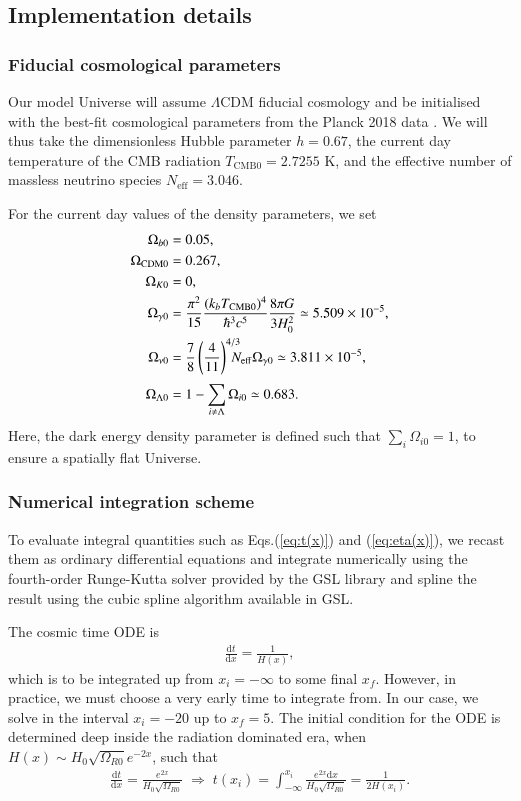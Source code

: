 \documentclass[twocolumn]{aa}
\renewcommand{\d}{\text{d}}
\newcommand{\dd}[2]{\frac{\d #1}{\d #2}}
\begin{document}
\subsection{Implementation details}
\subsubsection{Fiducial cosmological parameters}
Our model Universe will assume $\Lambda$CDM fiducial cosmology and be initialised with the best-fit cosmological parameters from the Planck 2018 data \citep{planck2020}. We will thus take the dimensionless Hubble parameter $h=0.67$, the current day temperature of the CMB radiation $T_\text{CMB0} = 2.7255\text{ K}$, and the effective number of massless neutrino species $N_\text{eff}=3.046$.

For the current day values of the density parameters, we set 
\begin{align*}
      \Omega_{b0} &= 0.05,\\
      \Omega_\text{CDM0} &= 0.267,\\
      \Omega_{K0} &= 0,\\
      \Omega_{\gamma0} &=  \frac{\pi^2}{15} \frac{(k_bT_{\rm CMB 0})^4}{\hbar^3 c^5} \frac{8\pi G} {3H_0^2} \simeq 5.509\times 10^{-5},\\
      \Omega_{\nu 0} &= \frac{7}{8}\left(\frac{4}{11}\right)^{4/3}\hspace{-3mm}N_{\rm eff}\Omega_{\gamma 0} \simeq 3.811 \times 10^{-5},\\[1mm]
      \Omega_{\Lambda0}&= 1-\sum_{i\neq \Lambda} \Omega_{i0} \simeq 0.683.
\end{align*}
Here, the dark energy density parameter is defined such that $\sum_i \Omega_{i0} =1$, to ensure a spatially flat Universe. 

\subsubsection{Numerical integration scheme}
\label{subsub:numerical int scheme}

To evaluate integral quantities such as Eqs.(\ref{eq:t(x)}) and (\ref{eq:eta(x)}), we recast them as ordinary differential equations and integrate numerically using the fourth-order Runge-Kutta solver provided by the GSL library \citep{gsl} and spline the result using the cubic spline algorithm available in GSL.

The cosmic time ODE is
\begin{align*}
      \dd{t}{x} = \frac{1}{H(x)},
\end{align*}
which is to be integrated up from $x_{i}=-\infty$ to some final $x_f$. However, in practice, we must choose a very early time to integrate from. In our case, we solve in the interval $x_i = -20$ up to $x_f=5$. The initial condition for the ODE is determined deep inside the radiation dominated era, when $H(x)\sim H_0\sqrt{\Omega_{R0}}e^{-2x}$, such that
\begin{align*}
      \dd{t}{x} = \frac{e^{2x}}{H_0\sqrt{\Omega_{R0}}}\;\Rightarrow\;  t(x_i) = \int_{-\infty}^{x_i}  \frac{e^{2x}\d x}{H_0\sqrt{\Omega_{R0}}} = \frac{1}{2H(x_i)}.
\end{align*}
\end{document}
